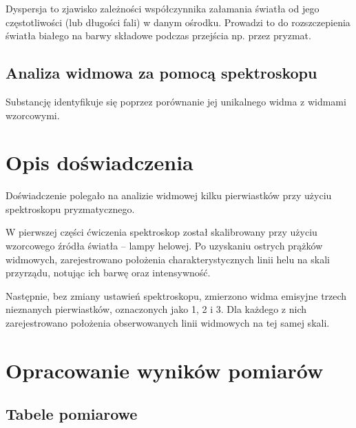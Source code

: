 \documentclass[a4paper,12pt]{article}
\begin{document}
Dyspersja to zjawisko zależności współczynnika załamania światła od jego częstotliwości (lub długości fali) w danym ośrodku. Prowadzi to do rozszczepienia światła białego na barwy składowe podczas przejścia np. przez pryzmat.~\cite{Drynski1976}

\subsection*{Analiza widmowa za pomocą spektroskopu}

Substancję identyfikuje się poprzez porównanie jej unikalnego widma z widmami wzorcowymi.

\section{Opis doświadczenia}

Doświadczenie polegało na analizie widmowej kilku pierwiastków przy użyciu spektroskopu pryzmatycznego.

W pierwszej części ćwiczenia spektroskop został skalibrowany przy użyciu wzorcowego źródła światła -- lampy helowej. Po uzyskaniu ostrych prążków widmowych, zarejestrowano położenia charakterystycznych linii helu na skali przyrządu, notując ich barwę oraz intensywność.

Następnie, bez zmiany ustawień spektroskopu, zmierzono widma emisyjne trzech nieznanych pierwiastków, oznaczonych jako 1, 2 i 3. Dla każdego z nich zarejestrowano położenia obserwowanych linii widmowych na tej samej skali.

\section{Opracowanie wyników pomiarów}

\subsection{Tabele pomiarowe}
\end{document}
